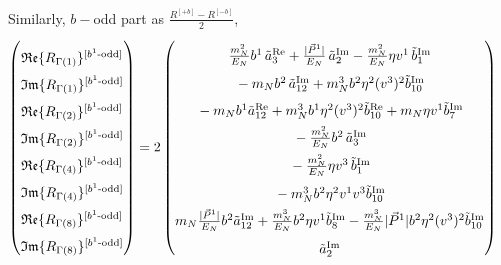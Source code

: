 \documentclass[]{article}
\numberwithin{equation}{section}
\newcommand{\bvec}{b}
\newcommand{\mN}{m_N}
\begin{document}
Similarly,  $b-$odd part as $\frac{R^{[+b]}-R^{[-b]}}{2}$,
\begin{align}
    \begin{pmatrix}
        \rule{0pt}{16pt} \mathfrak{Re}\{ R_{\Gamma(1)}\}^{[b^{1}\text{-odd}]} \\
        \rule{0pt}{16pt} \mathfrak{Im}\{ R_{\Gamma(1)}\}^{[b^{1}\text{-odd}]} \\
        \rule{0pt}{16pt} \mathfrak{Re}\{ R_{\Gamma(2)}\}^{[b^{1}\text{-odd}]} \\
        \rule{0pt}{16pt} \mathfrak{Im}\{ R_{\Gamma(2)}\}^{[b^{1}\text{-odd}]} \\
        \rule{0pt}{16pt} \mathfrak{Re}\{ R_{\Gamma(4)}\}^{[b^{1}\text{-odd}]} \\
        \rule{0pt}{16pt} \mathfrak{Im}\{ R_{\Gamma(4)}\}^{[b^{1}\text{-odd}]} \\
        \rule{0pt}{16pt} \mathfrak{Re}\{ R_{\Gamma(8)}\}^{[b^{1}\text{-odd}]} \\
        \rule{0pt}{16pt} \mathfrak{Im}\{ R_{\Gamma(8)}\}^{[b^{1}\text{-odd}]}
    \end{pmatrix} &= 2\begin{pmatrix}
     \rule{0pt}{16pt}   \frac{\mN^2}{E_N} \bvec^1\, \tilde a^{\text{Re}}_3+\frac{|\vec{P}^1|}{E_N}\, \tilde a^{\text{Im}}_2- \frac{\mN^2}{E_N} \eta v^1\, \tilde b^{\text{Im}}_1\\
      \rule{0pt}{16pt}  -  \mN  \bvec^2 \, \tilde a^{\text{Im}}_{12}+  \mN^3  \bvec^2 \eta^2 (v^3)^2 \tilde b^{\text{Im}}_{10}\\
      \rule{0pt}{16pt}  
		-  \mN   \bvec^1  \tilde a^{\text{Re}}_{12}+ \mN^3  \bvec^1 \eta^2 (v^3)^2 \tilde b^{\text{Re}}_{10}+\mN \eta v^1  \tilde b^{\text{Im}}_7 \\
      \rule{0pt}{16pt}  -  \frac{\mN^2}{E_N} \bvec^2\, \tilde a^{\text{Im}}_3\\
      \rule{0pt}{16pt} -\frac{\mN^2}{E_N} \eta v^3\, \tilde b^{\text{Im}}_1\\
      \rule{0pt}{16pt}  -\mN^3 \bvec^2 \eta^2 v^1 v^3\tilde b^{\text{Im}}_{10}\\
      \rule{0pt}{16pt}    \mN  \frac{|\vec{P}^1|}{E_N} \bvec^2  \tilde a^{\text{Im}}_{12}+ \frac{  \mN^3}{E_N}  \bvec^2 \eta v^1  \tilde b^{\text{Im}}_8- \frac{ \mN^3}{E_N}  |\vec{P}^1| \bvec^2 \eta^2 (v^3)^2 \tilde b^{\text{Im}}_{10}\\
      \rule{0pt}{16pt} \tilde a^{\text{Im}}_2
    \end{pmatrix}
\end{align}
\end{document}
